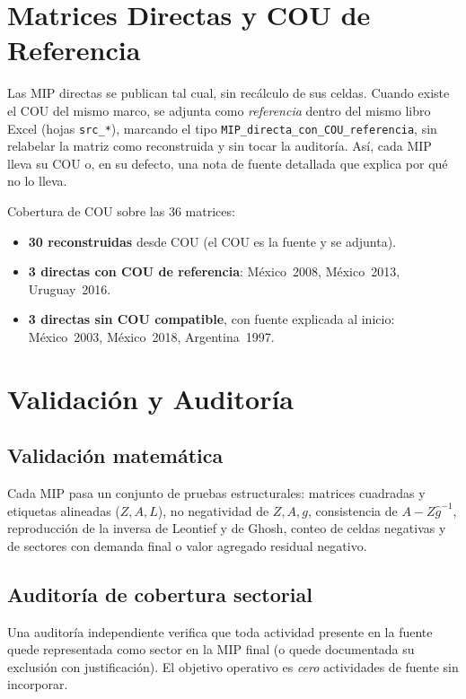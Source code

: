 \documentclass[11pt,a4paper]{article}
\begin{document}
\section{Matrices Directas y COU de Referencia}

Las MIP directas se publican tal cual, sin recálculo de sus celdas. Cuando existe
el COU del mismo marco, se adjunta como \emph{referencia} dentro del mismo libro
Excel (hojas \texttt{src\_*}), marcando el tipo
\texttt{MIP\_directa\_con\_COU\_referencia}, sin relabelar la matriz como
reconstruida y sin tocar la auditoría. Así, cada MIP lleva su COU o, en su
defecto, una nota de fuente detallada que explica por qué no lo lleva.

\medskip
\noindent Cobertura de COU sobre las 36 matrices:
\begin{itemize}[leftmargin=1.6em,nosep]
  \item \textbf{30 reconstruidas} desde COU (el COU es la fuente y se adjunta).
  \item \textbf{3 directas con COU de referencia}: México~2008, México~2013,
        Uruguay~2016.
  \item \textbf{3 directas sin COU compatible}, con fuente explicada al inicio:
        México~2003, México~2018, Argentina~1997.
\end{itemize}

\section{Validación y Auditoría}

\subsection{Validación matemática}
Cada MIP pasa un conjunto de pruebas estructurales: matrices cuadradas y
etiquetas alineadas ($Z,A,L$), no negatividad de $Z,A,g$, consistencia de
$A-Z\hat{g}^{-1}$, reproducción de la inversa de Leontief y de Ghosh, conteo de
celdas negativas y de sectores con demanda final o valor agregado residual
negativo.

\subsection{Auditoría de cobertura sectorial}
Una auditoría independiente verifica que toda actividad presente en la fuente
quede representada como sector en la MIP final (o quede documentada su exclusión
con justificación). El objetivo operativo es \emph{cero} actividades de fuente sin
incorporar.
\end{document}
